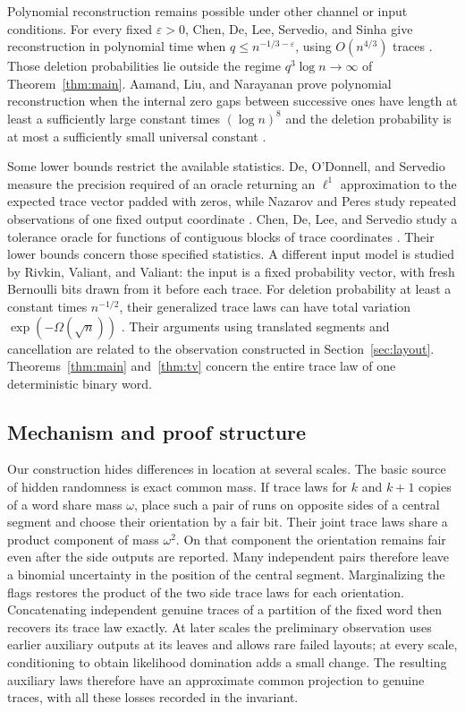 Polynomial reconstruction remains possible under other channel or input conditions.  For every fixed $\varepsilon>0$, Chen, De, Lee, Servedio, and Sinha give reconstruction in polynomial time when $q\le n^{-1/3-\varepsilon}$, using $O(n^{4/3})$ traces \citep{CDLSS2021LowDeletion}.  Those deletion probabilities lie outside the regime $q^3\log n\to\infty$ of Theorem~\ref{thm:main}.  Aamand, Liu, and Narayanan prove polynomial reconstruction when the internal zero gaps between successive ones have length at least a sufficiently large constant times $(\log n)^8$ and the deletion probability is at most a sufficiently small universal constant \citep{ALN2025}.

Some lower bounds restrict the available statistics.  De, O'Donnell, and Servedio measure the precision required of an oracle returning an $\ell^1$ approximation to the expected trace vector padded with zeros, while Nazarov and Peres study repeated observations of one fixed output coordinate \citep{DOS2017,NP2017}.  Chen, De, Lee, and Servedio study a tolerance oracle for functions of contiguous blocks of trace coordinates \citep{CDLS2024}.  Their lower bounds concern those specified statistics.  A different input model is studied by Rivkin, Valiant, and Valiant: the input is a fixed probability vector, with fresh Bernoulli bits drawn from it before each trace.  For deletion probability at least a constant times $n^{-1/2}$, their generalized trace laws can have total variation $\exp(-\Omega(\sqrt n))$ \citep{RivkinValiantValiant2025}.  Their arguments using translated segments and cancellation are related to the observation constructed in Section~\ref{sec:layout}.  Theorems~\ref{thm:main} and~\ref{thm:tv} concern the entire trace law of one deterministic binary word.

\subsection{Mechanism and proof structure}

Our construction hides differences in location at several scales.  The basic source of hidden randomness is exact common mass.  If trace laws for $k$ and $k+1$ copies of a word share mass $\omega$, place such a pair of runs on opposite sides of a central segment and choose their orientation by a fair bit.  Their joint trace laws share a product component of mass $\omega^2$.  On that component the orientation remains fair even after the side outputs are reported.  Many independent pairs therefore leave a binomial uncertainty in the position of the central segment.  Marginalizing the flags restores the product of the two side trace laws for each orientation.  Concatenating independent genuine traces of a partition of the fixed word then recovers its trace law exactly.  At later scales the preliminary observation uses earlier auxiliary outputs at its leaves and allows rare failed layouts; at every scale, conditioning to obtain likelihood domination adds a small change.  The resulting auxiliary laws therefore have an approximate common projection to genuine traces, with all these losses recorded in the invariant.

